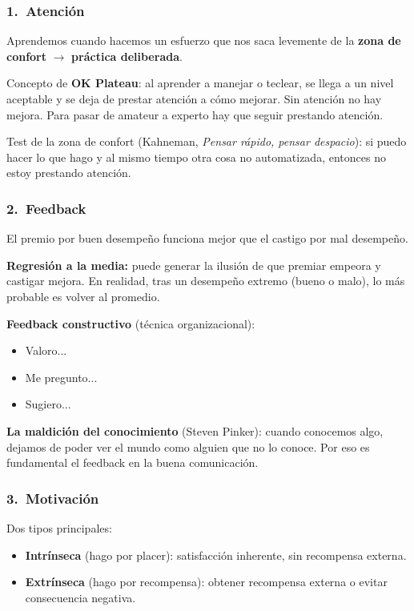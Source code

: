 \documentclass[11pt, a4paper]{article}
\begin{document}
\subsubsection{1.\ Atenci\'on}

Aprendemos cuando hacemos un esfuerzo que nos saca levemente de la \textbf{zona de confort} $\to$ \textbf{pr\'actica deliberada}.

Concepto de \textbf{OK Plateau}: al aprender a manejar o teclear, se llega a un nivel aceptable y se deja de prestar atenci\'on a c\'omo mejorar. Sin atenci\'on no hay mejora. Para pasar de amateur a experto hay que seguir prestando atenci\'on.

Test de la zona de confort (Kahneman, \textit{Pensar r\'apido, pensar despacio}): si puedo hacer lo que hago y al mismo tiempo otra cosa no automatizada, entonces no estoy prestando atenci\'on.

\subsubsection{2.\ Feedback}

El premio por buen desempe\~no funciona mejor que el castigo por mal desempe\~no.

\textbf{Regresi\'on a la media:} puede generar la ilusi\'on de que premiar empeora y castigar mejora. En realidad, tras un desempe\~no extremo (bueno o malo), lo m\'as probable es volver al promedio.

\textbf{Feedback constructivo} (t\'ecnica organizacional):
\begin{itemize}[nosep]
    \item Valoro...
    \item Me pregunto...
    \item Sugiero...
\end{itemize}

\textbf{La maldici\'on del conocimiento} (Steven Pinker): cuando conocemos algo, dejamos de poder ver el mundo como alguien que no lo conoce. Por eso es fundamental el feedback en la buena comunicaci\'on.

\subsubsection{3.\ Motivaci\'on}

Dos tipos principales:
\begin{itemize}[nosep]
    \item \textbf{Intr\'inseca} (hago por placer): satisfacci\'on inherente, sin recompensa externa.
    \item \textbf{Extr\'inseca} (hago por recompensa): obtener recompensa externa o evitar consecuencia negativa.
\end{itemize}
\end{document}
